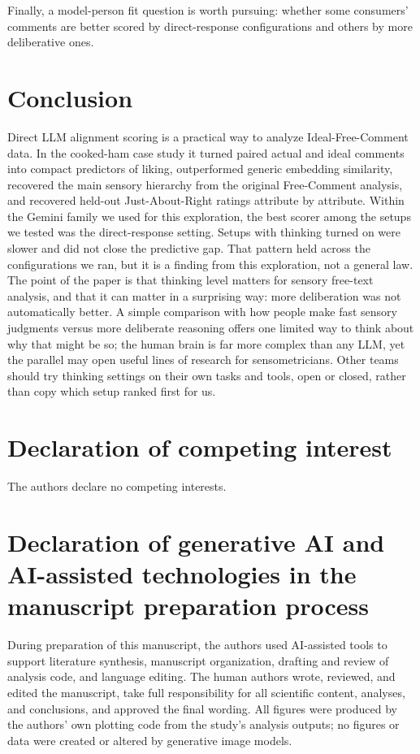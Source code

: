 \documentclass[11pt]{article}
\begin{document}
Finally, a model-person fit question is worth pursuing: whether some
consumers' comments are better scored by direct-response configurations and
others by more deliberative ones.

\section{Conclusion}
\label{sec:conclusion}

Direct LLM alignment scoring is a practical way to analyze Ideal-Free-Comment
data. In the cooked-ham case study it turned paired actual and ideal comments
into compact predictors of liking, outperformed generic embedding similarity,
recovered the main sensory hierarchy from the original Free-Comment analysis,
and recovered held-out Just-About-Right ratings attribute by attribute. Within
the Gemini family we used for this exploration, the best scorer among the
setups we tested was the direct-response setting. Setups with thinking turned
on were slower and did not close the predictive gap. That pattern held across
the configurations we ran, but it is a finding from this exploration, not a
general law. The point of the paper is that thinking level matters for sensory
free-text analysis, and that it can matter in a surprising way: more
deliberation was not automatically better. A simple comparison with how people
make fast sensory judgments versus more deliberate reasoning offers one
limited way to think about why that might be so; the human brain is far more
complex than any LLM, yet the parallel may open useful lines of research for
sensometricians. Other teams should try thinking settings on their own tasks
and tools, open or closed, rather than copy which setup ranked first for us.

\section*{Declaration of competing interest}

The authors declare no competing interests.

\section*{Declaration of generative AI and AI-assisted technologies in the manuscript preparation process}

During preparation of this manuscript, the authors used AI-assisted tools to
support literature synthesis, manuscript organization, drafting and review of
analysis code, and language editing. The human authors wrote, reviewed, and
edited the manuscript, take full responsibility for all scientific content,
analyses, and conclusions, and approved the final wording. All figures were
produced by the authors' own plotting code from the study's analysis outputs;
no figures or data were created or altered by generative image models.
\end{document}
